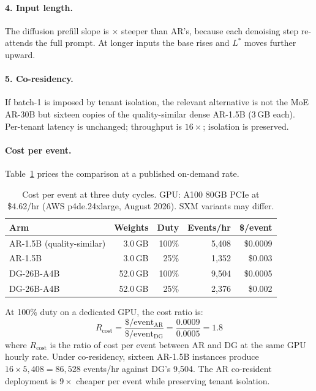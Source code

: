 \paragraph{4. Input length.}

The diffusion prefill slope is $\times$ steeper than
AR's, because each denoising step re-attends the full prompt. At
longer inputs the base rises and $L^{*}$ moves further upward.

\paragraph{5. Co-residency.}

If batch-1 is imposed by tenant isolation, the relevant alternative is
not the MoE AR-30B but sixteen copies of the quality-similar dense
AR-1.5B (3\,GB each). Per-tenant latency is unchanged; throughput is
$16\times$; isolation is preserved.

\paragraph{Cost per event.}

Table~\ref{tab:cost} prices the comparison at a published on-demand
rate.

\begin{table}[h]
\centering
\caption{Cost per event at three duty cycles. GPU: A100 80GB PCIe at
\$4.62/hr (AWS p4de.24xlarge, August 2026). SXM variants may differ.}
\label{tab:cost}
\begin{tabular}{@{}lrrrr@{}}
\toprule
Arm & Weights & Duty & Events/hr & \$/event \\
\midrule
AR-1.5B (quality-similar) & 3.0\,GB & 100\% & 5{,}408 & \$0.0009 \\
AR-1.5B                   & 3.0\,GB & 25\%  & 1{,}352 & \$0.003 \\
\midrule
DG-26B-A4B                 & 52.0\,GB & 100\% & 9{,}504 & \$0.0005 \\
DG-26B-A4B                 & 52.0\,GB & 25\%  & 2{,}376 & \$0.002 \\
\bottomrule
\end{tabular}
\end{table}

At 100\% duty on a dedicated GPU, the cost ratio is:
\begin{equation}
R_{\mathrm{cost}} = \frac{\$ / \mathrm{event}_{\mathrm{AR}}}
{\$ / \mathrm{event}_{\mathrm{DG}}}
= \frac{0.0009}{0.0005} = 1.8
\end{equation}
where $R_{\mathrm{cost}}$ is the ratio of cost per event between AR
and DG at the same GPU hourly rate. Under co-residency, sixteen
AR-1.5B instances produce $16 \times 5{,}408 = 86{,}528$ events/hr
against DG's 9{,}504. The AR co-resident deployment is $9\times$
cheaper per event while preserving tenant isolation.
